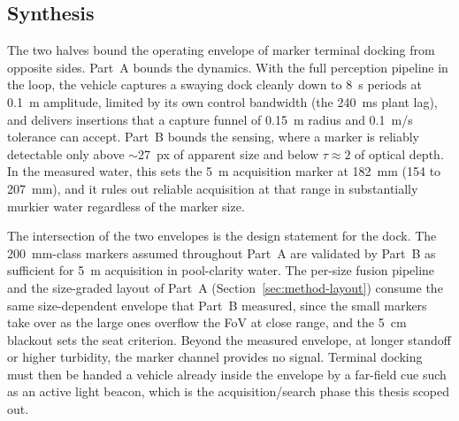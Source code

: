 \subsection{Synthesis}

The two halves bound the operating envelope of marker terminal docking from opposite sides. Part~A bounds the dynamics. With the full perception pipeline in the loop, the vehicle captures a swaying dock cleanly down to 8~s periods at 0.1~m amplitude, limited by its own control bandwidth (the 240~ms plant lag), and delivers insertions that a capture funnel of 0.15~m radius and 0.1~m/s tolerance can accept. Part~B bounds the sensing, where a marker is reliably detectable only above $\sim$27~px of apparent size and below $\tau \approx 2$ of optical depth. In the measured water, this sets the 5~m acquisition marker at 182~mm (154 to 207~mm), and it rules out reliable acquisition at that range in substantially murkier water regardless of the marker size.

The intersection of the two envelopes is the design statement for the dock. The 200~mm-class markers assumed throughout Part~A are validated by Part~B as sufficient for 5~m acquisition in pool-clarity water. The per-size fusion pipeline and the size-graded layout of Part~A (Section~\ref{sec:method-layout}) consume the same size-dependent envelope that Part~B measured, since the small markers take over as the large ones overflow the FoV at close range, and the 5~cm blackout sets the seat criterion. Beyond the measured envelope, at longer standoff or higher turbidity, the marker channel provides no signal. Terminal docking must then be handed a vehicle already inside the envelope by a far-field cue such as an active light beacon, which is the acquisition/search phase this thesis scoped out.
